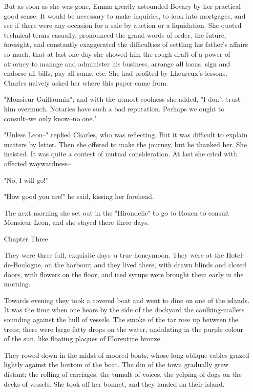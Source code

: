 \documentclass[11pt,twocolumn]{ltugboat}
\begin{document}
But as soon as she was gone, Emma greatly astounded Bovary by her
practical good sense. It would be necessary to make inquiries, to look
into mortgages, and see if there were any occasion for a sale by auction
or a liquidation. She quoted technical terms casually, pronounced the
grand words of order, the future, foresight, and constantly exaggerated
the difficulties of settling his father's affairs so much, that at last
one day she showed him the rough draft of a power of attorney to manage
and administer his business, arrange all loans, sign and endorse all
bills, pay all sums, etc. She had profited by Lheureux's lessons.
Charles naively asked her where this paper came from.

"Monsieur Guillaumin"; and with the utmost coolness she added, "I don't
trust him overmuch. Notaries have such a bad reputation. Perhaps we
ought to consult--we only know--no one."

"Unless Leon--" replied Charles, who was reflecting. But it was
difficult to explain matters by letter. Then she offered to make the
journey, but he thanked her. She insisted. It was quite a contest of
mutual consideration. At last she cried with affected waywardness--

"No, I will go!"

"How good you are!" he said, kissing her forehead.

The next morning she set out in the "Hirondelle" to go to Rouen to
consult Monsieur Leon, and she stayed there three days.



Chapter Three

They were three full, exquisite days--a true honeymoon. They were at
the Hotel-de-Boulogne, on the harbour; and they lived there, with drawn
blinds and closed doors, with flowers on the floor, and iced syrups were
brought them early in the morning.

Towards evening they took a covered boat and went to dine on one of the
islands. It was the time when one hears by the side of the dockyard the
caulking-mallets sounding against the hull of vessels. The smoke of
the tar rose up between the trees; there were large fatty drops on the
water, undulating in the purple colour of the sun, like floating plaques
of Florentine bronze.

They rowed down in the midst of moored boats, whose long oblique cables
grazed lightly against the bottom of the boat. The din of the town
gradually grew distant; the rolling of carriages, the tumult of voices,
the yelping of dogs on the decks of vessels. She took off her bonnet,
and they landed on their island.
\end{document}
